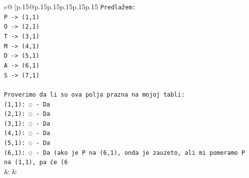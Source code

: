 \documentclass{article}
\begin{document}
{\begin{supertabular}{c@{$\;$}|p{.15\linewidth}@{}p{.15\linewidth}p{.15\linewidth}p{.15\linewidth}p{.15\linewidth}p{.15\linewidth}}
{{{\texttt{Predlažem:} \\
\texttt{P {-}> (1,1)} \\
\texttt{O {-}> (2,1)} \\
\texttt{T {-}> (3,1)} \\
\texttt{M {-}> (4,1)} \\
\texttt{D {-}> (5,1)} \\
\texttt{A {-}> (6,1)} \\
\texttt{S {-}> (7,1)} \\
\\ 
\texttt{Proverimo da li su ova polja prazna na mojoj tabli:} \\
\texttt{(1,1): ◌ {-} Da} \\
\texttt{(2,1): ◌ {-} Da} \\
\texttt{(3,1): ◌ {-} Da} \\
\texttt{(4,1): ◌ {-} Da} \\
\texttt{(5,1): ◌ {-} Da} \\
\texttt{(6,1): ◌ {-} Da (ako je P na (6,1), onda je zauzeto, ali mi pomeramo P na (1,1), pa će (6} \\
            }
        }
    }
    & & \\ \\


\end{supertabular}}
\end{document}
